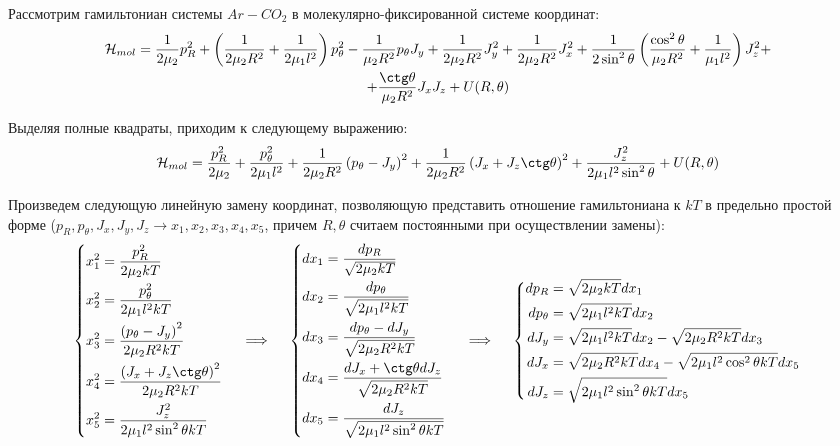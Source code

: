 \documentclass[14pt]{article}
\newcommand{\lb}{\left(}
\newcommand{\rb}{\right)}
\newcommand{\mH}{\mathcal{H}}
\begin{document}
Рассмотрим гамильтониан системы $Ar-CO_2$ в молекулярно-фиксированной системе координат:
\begin{gather}
\mH_{mol} = \frac{1}{2 \mu_2} p_R^2 + \lb \frac{1}{2 \mu_2 R^2} + \frac{1}{2 \mu_1 l^2} \rb p_\theta^2 - \frac{1}{\mu_2 R^2} p_\theta J_y + \frac{1}{2 \mu_2 R^2} J_y^2 + \frac{1}{2 \mu_2 R^2} J_x^2 + \frac{1}{2 \sin^2 \theta} \lb \frac{\cos^2 \theta}{\mu_2 R^2} + \frac{1}{\mu_1 l^2} \rb J_z^2 + \notag \\
+ \frac{\ctg \theta}{\mu_2 R^2} J_x J_z + U(R, \theta) \notag
\end{gather}

Выделяя полные квадраты, приходим к следующему выражению:
\begin{gather}
	\mH_{mol} = \frac{p_R^2}{2 \mu_2} + \frac{p_\theta^2}{2 \mu_1 l^2} + \frac{1}{2 \mu_2 R^2} \lb p_\theta - J_y \rb^2 + \frac{1}{2 \mu_2 R^2} \lb J_x + J_z \ctg \theta \rb^2 + \frac{J_z^2}{2 \mu_1 l^2 \sin^2 \theta} + U(R, \theta) \notag
\end{gather}

Произведем следующую линейную замену координат, позволяющую представить отношение гамильтониана к $kT$ в предельно простой форме ($p_R, p_\theta, J_x, J_y, J_z \rightarrow x_1, x_2, x_3, x_4, x_5$, причем $R, \theta$ считаем постоянными при осуществлении замены):
\begin{gather}
	\left\{
	\begin{aligned}
	x_1^2 &= \frac{p_R^2}{2 \mu_2 kT} \\
	x_2^2 &= \frac{p_\theta^2}{2 \mu_1 l^2 kT} \\
	x_3^2 &= \frac{ \lb p_\theta - J_y \rb^2}{2 \mu_2 R^2 k T} \\
	x_4^2 &= \frac{ \lb J_x + J_z \ctg \theta \rb^2}{2 \mu_2 R^2 k T} \\
	x_5^2 &= \frac{J_z^2}{2 \mu_1 l^2 \sin^2 \theta kT}
	\end{aligned}
	\right. \quad \implies \quad 
	\left\{
	\begin{aligned}
	dx_1 &= \frac{dp_R}{\sqrt{ 2 \mu_2 k T}} \\
	dx_2 &= \frac{dp_\theta}{\sqrt{2 \mu_1 l^2 k T}} \\
	dx_3 &= \frac{dp_\theta - dJ_y}{\sqrt{2 \mu_2 R^2 k T}} \\
	dx_4 &= \frac{dJ_x + \ctg \theta dJ_z}{ \sqrt{2 \mu_2 R^2 k T}} \\
	dx_5 &= \frac{dJ_z}{\sqrt{2 \mu_1 l^2 \sin^2 \theta k T}}
	\end{aligned}
	\right. \quad \implies \quad
	\left\{
	\begin{aligned}
		dp_R &= \sqrt{2 \mu_2 k T} dx_1 \\
		dp_\theta &= \sqrt{2 \mu_1 l^2 kT} dx_2 \\
		dJ_y &= \sqrt{2 \mu_1 l^2 kT} dx_2 - \sqrt{2 \mu_2 R^2 kT} dx_3 \\
		dJ_x &= \sqrt{2 \mu_2 R^2 kT} dx_4 - \sqrt{2 \mu_1 l^2 \cos^2 \theta kT} dx_5 \\
		dJ_z &= \sqrt{2 \mu_1 l^2 \sin^2 \theta kT} dx_5
	\end{aligned}
	\right.
	\notag
\end{gather}
\end{document}
